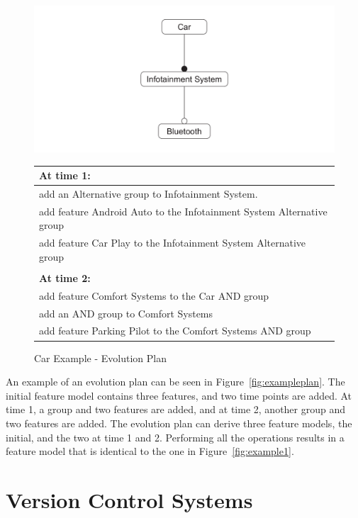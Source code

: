 \documentclass[a4paper,english]{ifimaster}
\begin{document}
\begin{figure}[htpb]
	\centering
	\includegraphics[width=0.8\linewidth]{illustrations/initial.pdf}
	\begin{tabular}{l}
		\textbf{At time 1:}                                           \\ \hline
		add an Alternative group to Infotainment System.                      \\
		add feature Android Auto to the Infotainment System Alternative group \\
		add feature Car Play to the Infotainment System Alternative group     \\
		\\
		\textbf{At time 2:}                                           \\ \hline
		add feature Comfort Systems to the Car AND group              \\
		add an AND group to Comfort Systems                           \\
		add feature Parking Pilot to the Comfort Systems AND group
	\end{tabular}
	\caption{Car Example - Evolution Plan}%
	\label{fig:exampleplan}
\end{figure}

An example of an evolution plan can be seen in Figure~\vref{fig:exampleplan}. The initial feature model contains three features, and two time points are added. At time 1, a group and two features are added, and at time 2, another group and two features are added. The evolution plan can derive three feature models, the initial, and the two at time 1 and 2. Performing all the operations results in a feature model that is identical to the one in Figure~\vref{fig:example1}.

\section{Version Control Systems}%
\label{sec:version_control_systems}
\end{document}
